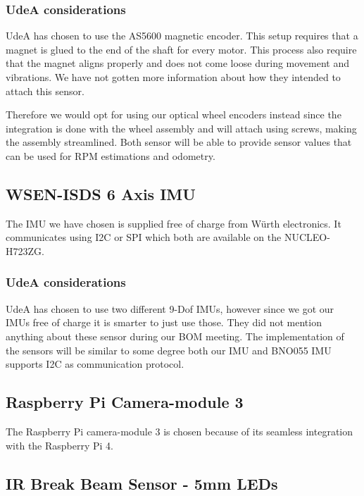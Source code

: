 \documentclass[a4paper,8pt]{article}
\begin{document}
  \subsubsection{UdeA considerations}

  UdeA has chosen to use the AS5600 magnetic encoder. This setup requires that a magnet is glued to the end of the shaft for every motor. This process also require that the magnet aligns properly and does not come loose during movement and vibrations. We have not gotten more information about how they intended to attach this sensor.

  Therefore we would opt for using our optical wheel encoders instead since the integration is done with the wheel assembly and will attach using screws, making the assembly streamlined. Both sensor will be able to provide sensor values that can be used for RPM estimations and odometry.

  \subsection{WSEN-ISDS 6 Axis IMU}

  The IMU we have chosen is supplied free of charge from Würth
  electronics. It communicates using I2C or SPI which both are available
  on the NUCLEO-H723ZG.

  \subsubsection{UdeA considerations}

  UdeA has chosen to use two different 9-Dof IMUs, however since we got our IMUs free of charge it is smarter to just use those. They did not mention anything about these sensor during our BOM meeting.
  The implementation of the sensors will be similar to some degree both our IMU and BNO055 IMU supports I2C as communication protocol.

  \subsection{Raspberry Pi Camera-module 3}

  The Raspberry Pi camera-module 3 is chosen because of its seamless
  integration with the Raspberry Pi 4.

  \subsection{IR Break Beam Sensor - 5mm LEDs}
\end{document}
